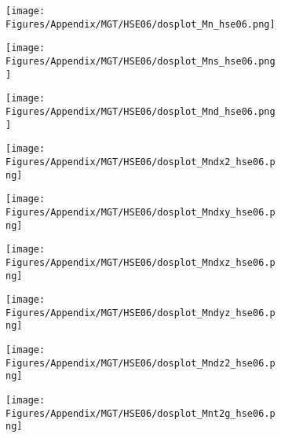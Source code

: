 \newpage
 \begin{figure}[H]
      \centering
    \begin{subfigure}{0.24\textwidth}
    \texttt{[image: Figures/Appendix/MGT/HSE06/dosplot\_Mn\_hse06.png]}
    \label{dosplot_Mn_hse06}   
    \end{subfigure}  
    \hfill
\begin{subfigure}{0.24\textwidth}
\centering
    \texttt{[image: Figures/Appendix/MGT/HSE06/dosplot\_Mns\_hse06.png]}
    \label{dosplot_Mns_hse06}
\end{subfigure}
\hfill
\begin{subfigure}{0.24\textwidth}
    \texttt{[image: Figures/Appendix/MGT/HSE06/dosplot\_Mnd\_hse06.png]}
    \label{dosplot_Mnd_hse06}
\end{subfigure}
\hfill
\begin{subfigure}{0.24\textwidth}
    \texttt{[image: Figures/Appendix/MGT/HSE06/dosplot\_Mndx2\_hse06.png]}
    \label{dodosplot_Mndx2_hse06}
\end{subfigure}
\hfill
\begin{subfigure}{0.24\textwidth}
    \texttt{[image: Figures/Appendix/MGT/HSE06/dosplot\_Mndxy\_hse06.png]}
    \label{dosplot_Mndxy_hse06}
\end{subfigure}
\hfill
\begin{subfigure}{0.24\textwidth}
    \texttt{[image: Figures/Appendix/MGT/HSE06/dosplot\_Mndxz\_hse06.png]}
    \label{dosplot_Mndxz_hse06}
\end{subfigure}
\hfill
\begin{subfigure}{0.24\textwidth}
    \texttt{[image: Figures/Appendix/MGT/HSE06/dosplot\_Mndyz\_hse06.png]}
    \label{dosplot_Mndyz_hse06}
\end{subfigure}
\hfill
\begin{subfigure}{0.24\textwidth}
    \texttt{[image: Figures/Appendix/MGT/HSE06/dosplot\_Mndz2\_hse06.png]}
    \label{dosplot_Mndz2_hse06}
\end{subfigure}
\hfill
\begin{subfigure}{0.24\textwidth}
    \texttt{[image: Figures/Appendix/MGT/HSE06/dosplot\_Mnt2g\_hse06.png]}
    \label{dosplot_Mnt2g_hse06}
\end{subfigure}
\hfill
\begin{subfigure}{0.24\textwidth}

\end{subfigure}
\end{figure}
